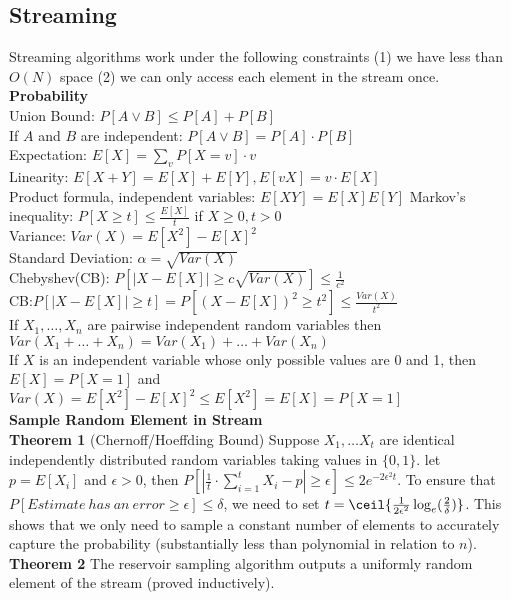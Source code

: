 \documentclass{article}
\begin{document}
\begin{multicols}{2}
\section*{Streaming}
Streaming algorithms work under the following constraints (1) we have less than $O(N)$ space (2) we can only access each element in the stream once. \\
\textbf{Probability} \\
Union Bound: $P[A \vee B] \leq P[A] + P[B]$ \\
If $A$ and $B$ are independent: $P[A \vee B] = P[A] \cdot P[B]$ \\
Expectation: $E[X] = \sum_v P[X=v] \cdot v$ \\
Linearity: $E[X+Y] = E[X] + E[Y], E[vX] = v \cdot E[X]$ \\
Product formula, independent variables: $E[XY] = E[X]E[Y]$
Markov's inequality: $P[X \geq t] \leq \frac{E[X]}{t}$ if $X \geq 0, t > 0$ \\
Variance: $Var(X) = E[X^2] - E[X]^2$ \\
Standard Deviation: $\alpha = \sqrt{Var(X)}$ \\
Chebyshev(CB): $P[|X - E[X]| \geq c \sqrt{Var(X)}] \leq \frac{1}{c^2}$ \\
CB:$P[|X - E[X]| \geq t] = P[(X - E[X])^2 \geq t^2] \leq \frac{Var(X)}{t^2}$\\
If $X_1, \ldots, X_n$ are pairwise independent random variables then $Var(X_1 + \ldots + X_n) = Var(X_1) + \ldots + Var(X_n)$ \\
If $X$ is an independent variable whose only possible values are 0 and 1, then $E[X] = P[X = 1]$ and $Var(X)  = E[X^2] - E[X]^2\leq E[X^2] = E[X] = P[X = 1]$ \\
\textbf{Sample Random Element in Stream} \\
\textbf{Theorem 1} (Chernoff/Hoeffding Bound) Suppose $X_1, \ldots X_t$ are identical independently distributed random variables taking values in $\{0, 1\}$. let $p = E[X_i]$ and $\epsilon > 0$, then $P[|\frac{1}{t} \cdot \sum_{i=1}^{t} X_i - p| \geq \epsilon] \leq 2e^{-2 \epsilon^2 t}$. To ensure that $P[Estimate\ has\ an\ error \geq \epsilon] \leq \delta$, we need to set $t = \ceil{\frac{1}{2 \epsilon ^2} \log_e (\frac{2}{\delta})}$. This shows that we only need to sample a constant number of elements to accurately capture the probability (substantially less than polynomial in relation to $n$).\\
\textbf{Theorem 2} The reservoir sampling algorithm outputs a uniformly random element of the stream (proved inductively). \\

\end{multicols}
\end{document}
